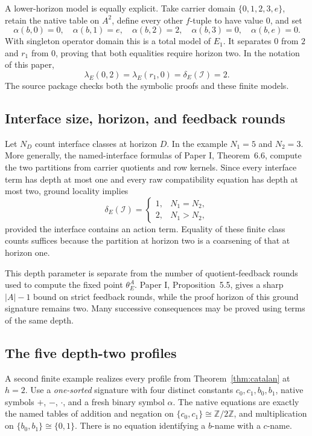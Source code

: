 A lower-horizon model is equally explicit. Take carrier domain $\{0,1,2,3,e\}$, retain the native table on $A^2$, define every other $f$-tuple to have value $0$, and set
\[
\alpha(b,0)=0,\quad \alpha(b,1)=e,\quad
\alpha(b,2)=2,\quad \alpha(b,3)=0,\quad \alpha(b,e)=0.
\]
With singleton operator domain this is a total model of $E_1$. It separates $0$ from $2$ and $r_1$ from $0$, proving that both equalities require horizon two. In the notation of this paper,
\[
\boxed{\lambda_E(0,2)=\lambda_E(r_1,0)=\delta_E(\mathcal I)=2.}
\]
The source package checks both the symbolic proofs and these finite models.

\subsection{Interface size, horizon, and feedback rounds}
Let $N_D$ count interface classes at horizon $D$. In the example $N_1=5$ and $N_2=3$. More generally, the named-interface formulas of Paper I, Theorem~6.6, compute the two partitions from carrier quotients and row kernels. Since every interface term has depth at most one and every raw compatibility equation has depth at most two, ground locality implies
\[
\delta_E(\mathcal I)=
\begin{cases}
1,&N_1=N_2,\\
2,&N_1>N_2,
\end{cases}
\]
provided the interface contains an action term. Equality of these finite class counts suffices because the partition at horizon two is a coarsening of that at horizon one.

This depth parameter is separate from the number of quotient-feedback rounds used to compute the fixed point $\theta_E^A$. Paper I, Proposition~5.5, gives a sharp $|A|-1$ bound on strict feedback rounds, while the proof horizon of this ground signature remains two. Many successive consequences may be proved using terms of the same depth.

\subsection{The five depth-two profiles}\label{sec:square}
A second finite example realizes every profile from Theorem~\ref{thm:catalan} at $h=2$. Use a \emph{one-sorted} signature with four distinct constants $c_0,c_1,b_0,b_1$, native symbols $+$, $-$, $\cdot$, and a fresh binary symbol $\alpha$. The native equations are exactly the named tables of addition and negation on $\{c_0,c_1\}\cong\mathbb Z/2\mathbb Z$, and multiplication on $\{b_0,b_1\}\cong\{0,1\}$. There is no equation identifying a $b$-name with a $c$-name.

